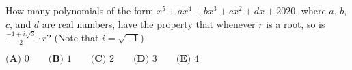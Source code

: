 How many polynomials of the form $x^5 + ax^4 + bx^3 + cx^2 + dx + 2020$, where $a$, $b$, $c$, and $d$ are real numbers, have the property that whenever $r$ is a root, so is $\frac{-1+i\sqrt{3}}{2} \cdot r$? (Note that $i=\sqrt{-1}$)

$\textbf{(A) } 0 \qquad \textbf{(B) }1 \qquad \textbf{(C) } 2 \qquad \textbf{(D) } 3 \qquad \textbf{(E) } 4$